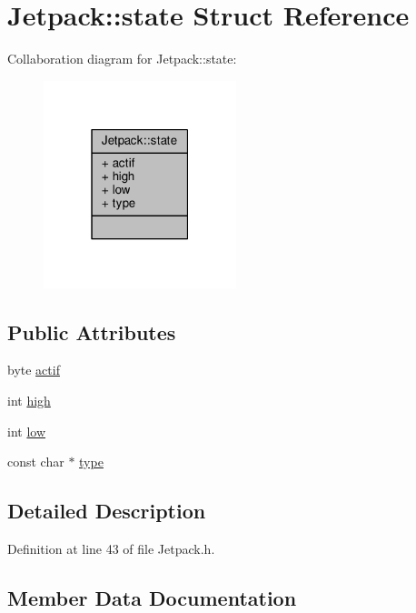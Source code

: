 \hypertarget{structJetpack_1_1state}{}\section{Jetpack\+:\+:state Struct Reference}
\label{structJetpack_1_1state}


Collaboration diagram for Jetpack\+:\+:state\+:
\nopagebreak
\begin{figure}[H]
\begin{center}
\leavevmode
\includegraphics[width=159pt]{structJetpack_1_1state__coll__graph}
\end{center}
\end{figure}
\subsection*{Public Attributes}
\begin{DoxyCompactItemize}
\item 
byte \hyperlink{structJetpack_1_1state_a3d62ba1ec895f03ee171efa7cdecf17f}{actif}
\item 
int \hyperlink{structJetpack_1_1state_a54cc9291c7cc30102a07fd2b0ccd8dde}{high}
\item 
int \hyperlink{structJetpack_1_1state_ace3ecd2b1f262756d8f7a8adda20136a}{low}
\item 
const char $\ast$ \hyperlink{structJetpack_1_1state_a59e307555493f5a64f87ac4c63943371}{type}
\end{DoxyCompactItemize}


\subsection{Detailed Description}


Definition at line 43 of file Jetpack.\+h.



\subsection{Member Data Documentation}
\mbox{\label{structJetpack_1_1state_a3d62ba1ec895f03ee171efa7cdecf17f}} 
